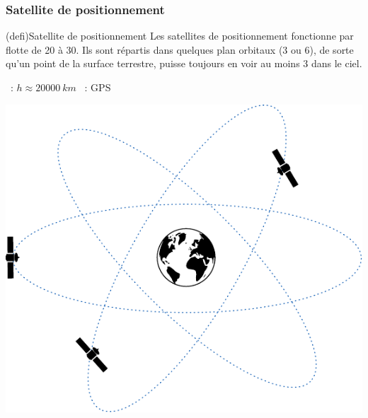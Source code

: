 \documentclass[../../main/main.tex]{subfiles}
\begin{document}
\subsubsection{Satellite de positionnement}
\begin{tcb*}[sidebyside](defi){Satellite de positionnement}
  Les satellites de positionnement fonctionne par flotte de 20 à 30. Ils sont
  répartis dans quelques plan orbitaux (3 ou 6), de sorte qu'un point de la
  surface terrestre, puisse toujours en voir au moins 3 dans le ciel.
  \begin{itemize}
    ~: $h \approx \SI{20000}{km}$
    ~: GPS
  \end{itemize}
  \tcblower
  \begin{center}
    \includegraphics[width=.6\linewidth]{sat_pos}
  \end{center}
\end{tcb*}
\end{document}
